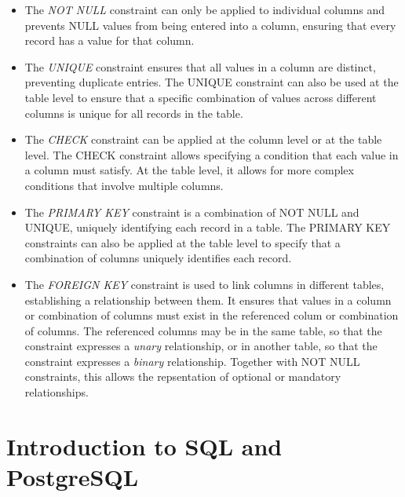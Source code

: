 \begin{itemize}
\item The \emph{NOT NULL} constraint can only be applied to individual columns and prevents NULL values from being entered into a column, ensuring that every record has a value for that column. 
\item The \emph{UNIQUE} constraint ensures that all values in a column are distinct, preventing duplicate entries. The UNIQUE constraint can also be used at the table level to ensure that a specific combination of values across different columns is unique for all records in the table. 
\item The \emph{CHECK} constraint can be applied at the column level or at the table level. The CHECK constraint allows specifying a condition that each value in a column must satisfy. At the table level, it allows for more complex conditions that involve multiple columns. 
\item The \emph{PRIMARY KEY} constraint is a combination of NOT NULL and UNIQUE, uniquely identifying each record in a table. The PRIMARY KEY constraints can also be applied at the table level to specify that a combination of columns uniquely identifies each record. 
\item The \emph{FOREIGN KEY} constraint is used to link columns in different tables, establishing a relationship between them. It ensures that values in a column or combination of columns must exist in the referenced colum or combination of columns. The referenced columns may be in the same table, so that the constraint expresses a \emph{unary} relationship, or in another table, so that the constraint expresses a \emph{binary} relationship. Together with NOT NULL constraints, this allows the repsentation of optional or mandatory relationships. 
\end{itemize}

\section{Introduction to SQL and PostgreSQL}

